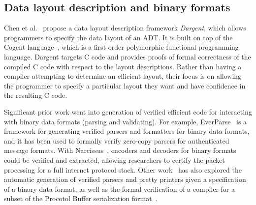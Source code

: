 \subsection{Data layout description and binary formats}

Chen et al.~\cite{Dargent} propose a data layout description framework \emph{Dargent}, which allows programmers to specify the data layout of an ADT. It is built on top of the Cogent language~\cite{o2016cogent}, which is a first order polymorphic functional programming language. Dargent targets C code and provides proofs of formal correctness of the compiled C code with respect to the layout descriptions. Rather than having a compiler attempting to determine an efficient layout, their focus is on allowing the programmer to specify a particular layout they want and have confidence in the resulting C code.



Significant prior work went into generation of verified efficient code for interacting with binary data formats (parsing and validating). For example, EverParse~\cite{EverParse} is a framework for generating verified parsers and formatters for binary data formats, and it has been used to formally verify zero-copy parsers for authenticated message formats. With Narcissus~\cite{Narcissus}, encoders and decoders for binary formats could be verified and extracted, allowing researchers to certify the packet processing for a full internet protocol stack. Other work~\cite{GenericPacketDescriptions} has also explored the automatic generation of verified parsers and pretty printers given a specification of a binary data format, as well as the formal verification of a compiler for a subset of the Procotol Buffer serialization format~\cite{VPBdeleware}.

